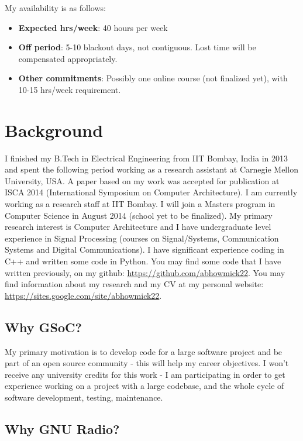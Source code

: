 \documentclass[a4paper,12pt,oneside]{article}
\begin{document}
My availability is as follows:

\begin{itemize}
\item \textbf{Expected hrs/week}: 40 hours per week
\item \textbf{Off period}: 5-10 blackout days, not contiguous. Lost time will be compensated appropriately.
\item \textbf{Other commitments}: Possibly one online course (not finalized yet), with 10-15 hrs/week requirement.
\end{itemize}

\section{Background}
I finished my B.Tech in Electrical Engineering from IIT Bombay, India in 2013 and spent the following period working as a research assistant at Carnegie Mellon University, USA. A paper based on my work was accepted for publication at ISCA 2014 (International Symposium on Computer Architecture). I am currently working as a research staff at IIT Bombay. I will join a Masters program in Computer Science in August 2014 (school yet to be finalized). My primary research interest is Computer Architecture and I have undergraduate level experience in Signal Processing (courses on Signal/Systems, Communication Systems and Digital Communications). I have significant experience coding in C++ and written some code in Python. You may find some code that I have written previously, on my github: \url{https://github.com/abhowmick22}. You may find information about my research and my CV at my personal website: \url{https://sites.google.com/site/abhowmick22}.  

\subsection{Why GSoC?}

My primary motivation is to develop code for a large software project and be part of an open source community - this will help my career objectives. I won't receive any university credits for this work - I am participating in order to get experience working on a project with a large codebase, and the whole cycle of software development, testing, maintenance. 

\subsection{Why GNU Radio?}
\end{document}
